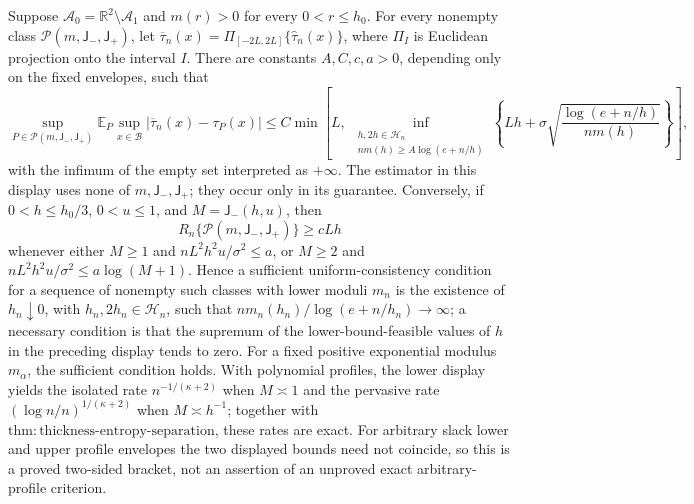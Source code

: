 Suppose \(\mathcal A_0=\mathbb R^2\setminus\mathcal A_1\) and \(m(r)>0\) for every \(0<r\le h_0\). For every nonempty class \(\mathcal P(m,\mathsf J_{-},\mathsf J_{+})\), let \(\overline\tau_n(x)=\Pi_{[-2L,2L]}\{\widehat\tau_n(x)\}\), where \(\Pi_I\) is Euclidean projection onto the interval \(I\). There are constants \(A,C,c,a>0\), depending only on the fixed envelopes, such that
\[
 \sup_{P\in\mathcal P(m,\mathsf J_{-},\mathsf J_{+})}
 \mathbb E_P\sup_{x\in\mathcal B}|\overline\tau_n(x)-\tau_P(x)|
 \le C\min\left[ L,\ 
 \inf_{\substack{h,2h\in\mathcal H_n\\nm(h)\ge A\log(e+n/h)}}
 \left\{Lh+\sigma\sqrt{\frac{\log(e+n/h)}{nm(h)}}\right\}\right],
\]
with the infimum of the empty set interpreted as \(+\infty\). The estimator in this display uses none of \(m,\mathsf J_{-},\mathsf J_{+}\); they occur only in its guarantee. Conversely, if \(0<h\le h_0/3\), \(0<u\le1\), and \(M=\mathsf J_{-}(h,u)\), then
\[
 R_n\{\mathcal P(m,\mathsf J_{-},\mathsf J_{+})\}\ge cLh
\]
whenever either \(M\ge1\) and \(nL^2h^2u/\sigma^2\le a\), or \(M\ge2\) and \(nL^2h^2u/\sigma^2\le a\log(M+1)\). Hence a sufficient uniform-consistency condition for a sequence of nonempty such classes with lower moduli \(m_n\) is the existence of \(h_n\downarrow0\), with \(h_n,2h_n\in\mathcal H_n\), such that \(nm_n(h_n)/\log(e+n/h_n)\to\infty\); a necessary condition is that the supremum of the lower-bound-feasible values of \(h\) in the preceding display tends to zero. For a fixed positive exponential modulus \(m_\alpha\), the sufficient condition holds. With polynomial profiles, the lower display yields the isolated rate \(n^{-1/(\kappa+2)}\) when \(M\asymp1\) and the pervasive rate \((\log n/n)^{1/(\kappa+2)}\) when \(M\asymp h^{-1}\); together with \(\mathrm{thm:thickness\text{-}entropy\text{-}separation}\), these rates are exact. For arbitrary slack lower and upper profile envelopes the two displayed bounds need not coincide, so this is a proved two-sided bracket, not an assertion of an unproved exact arbitrary-profile criterion.